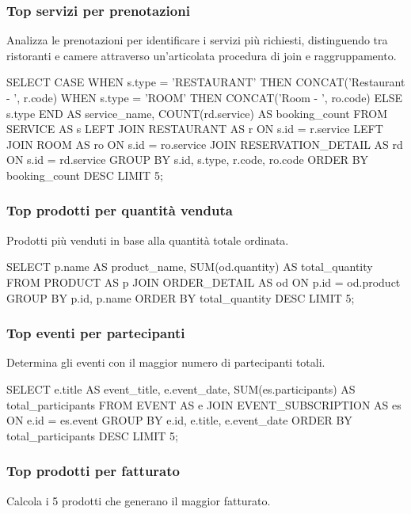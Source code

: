 \documentclass[a4paper,12pt]{report}
\begin{document}
\subsubsection{Top servizi per prenotazioni}
Analizza le prenotazioni per identificare i servizi più richiesti,
distinguendo tra ristoranti e camere attraverso un'articolata
procedura di join e raggruppamento.

\begin{sqlcode}[caption={}]
SELECT CASE
    WHEN s.type = 'RESTAURANT' THEN CONCAT('Restaurant - ', r.code)
    WHEN s.type = 'ROOM' THEN CONCAT('Room - ', ro.code)
    ELSE s.type
  END AS service_name,
  COUNT(rd.service) AS booking_count
FROM SERVICE AS s
LEFT JOIN RESTAURANT AS r ON s.id = r.service
LEFT JOIN ROOM AS ro ON s.id = ro.service
JOIN RESERVATION_DETAIL AS rd ON s.id = rd.service
GROUP BY s.id, s.type, r.code, ro.code
ORDER BY booking_count DESC
LIMIT 5;
\end{sqlcode}

\subsubsection{Top prodotti per quantità venduta}
Prodotti più venduti in base alla quantità totale ordinata.

\begin{sqlcode}[caption={}]
SELECT
  p.name AS product_name,
  SUM(od.quantity) AS total_quantity
FROM PRODUCT AS p
JOIN ORDER_DETAIL AS od ON p.id = od.product
GROUP BY p.id, p.name
ORDER BY total_quantity DESC
LIMIT 5;
\end{sqlcode}

\newpage
\subsubsection{Top eventi per partecipanti}
Determina gli eventi con il maggior numero di partecipanti totali.

\begin{sqlcode}[caption={}]
SELECT
  e.title AS event_title,
  e.event_date,
  SUM(es.participants) AS total_participants
FROM EVENT AS e
JOIN EVENT_SUBSCRIPTION AS es ON e.id = es.event
GROUP BY e.id, e.title, e.event_date
ORDER BY total_participants DESC
LIMIT 5;
\end{sqlcode}

\subsubsection{Top prodotti per fatturato}
Calcola i 5 prodotti che generano il maggior fatturato.
\end{document}
